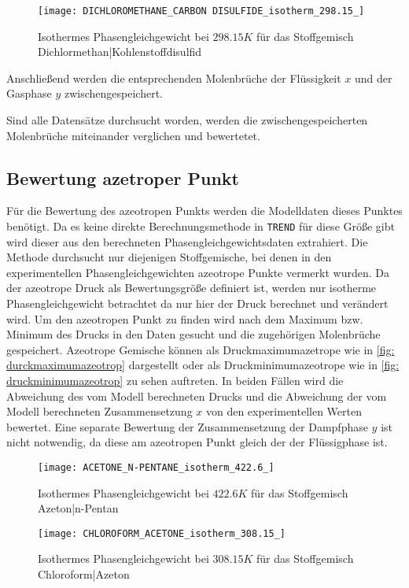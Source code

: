 \documentclass[../thesis.tex]{subfiles}
\begin{document}
\begin{figure}[htb]
	\centering
	\texttt{[image: DICHLOROMETHANE\_CARBON DISULFIDE\_isotherm\_298.15\_]}
	\caption{Isothermes Phasengleichgewicht bei $ 298.15 K$ für das Stoffgemisch Dichlormethan|Kohlenstoffdisulfid}
	\label{fig: phase_eq_datenausschluss}
\end{figure}

Anschließend werden die entsprechenden Molenbrüche der Flüssigkeit $x$ und der Gasphase $y$ zwischengespeichert.

Sind alle Datensätze durchsucht worden, werden die zwischengespeicherten Molenbrüche miteinander verglichen und bewertetet.

\subsection{Bewertung azetroper Punkt}

Für die Bewertung des azeotropen Punkts werden die Modelldaten dieses Punktes benötigt. Da es keine direkte Berechnungsmethode in \texttt{TREND} für diese Größe gibt wird dieser aus den berechneten Phasengleichgewichtsdaten extrahiert. Die Methode durchsucht nur diejenigen Stoffgemische, bei denen in den experimentellen Phasengleichgewichten azeotrope Punkte vermerkt wurden. Da der azeotrope Druck als Bewertungsgröße definiert ist, werden nur isotherme Phasengleichgewicht betrachtet da nur hier der Druck berechnet und verändert wird. Um den azeotropen Punkt zu finden wird nach dem Maximum bzw. Minimum des Drucks in den Daten gesucht und die zugehörigen Molenbrüche gespeichert. Azeotrope Gemische können als Druckmaximumazetrope wie in \autoref{fig: durckmaximumazeotrop} dargestellt oder als Druckminimumazeotrope wie in \autoref{fig: druckminimumazeotrop} zu sehen auftreten. In beiden Fällen wird die Abweichung des vom Modell berechneten Drucks und die Abweichung der vom Modell berechneten Zusammensetzung $x$ von den experimentellen Werten bewertet. Eine separate Bewertung der Zusammensetzung der Dampfphase $y$ ist nicht notwendig, da diese am azeotropen Punkt gleich der der Flüssigphase ist.  

\begin{figure}[htb]
	\centering
	\texttt{[image: ACETONE\_N-PENTANE\_isotherm\_422.6\_]}
	\caption{Isothermes Phasengleichgewicht bei $ 422.6 K$ für das Stoffgemisch Azeton|n-Pentan}
	\label{fig: durckmaximumazeotrop}
\end{figure}

\begin{figure}[htb]
	\centering
	\texttt{[image: CHLOROFORM\_ACETONE\_isotherm\_308.15\_]}
	\caption{Isothermes Phasengleichgewicht bei $ 308.15 K$ für das Stoffgemisch Chloroform|Azeton}
	\label{fig: druckminimumazeotrop}
\end{figure}
\end{document}
